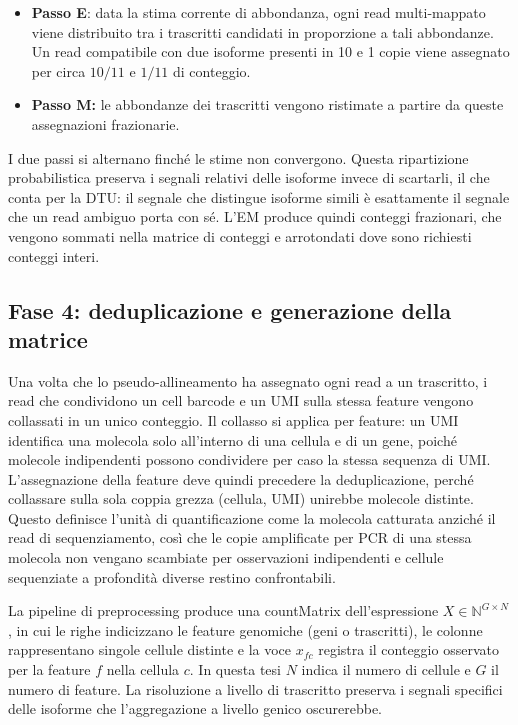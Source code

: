 \begin{itemize}
    \item \textbf{Passo E}: data la stima corrente di abbondanza, ogni read multi-mappato viene distribuito tra i trascritti candidati in proporzione a tali abbondanze. Un read compatibile con due isoforme presenti in 10 e 1 copie viene assegnato per circa $10/11$ e $1/11$ di conteggio.
    \item \textbf{Passo M:} le abbondanze dei trascritti vengono ristimate a partire da queste assegnazioni frazionarie.
\end{itemize}

I due passi si alternano finché le stime non convergono. Questa ripartizione probabilistica preserva i segnali relativi delle isoforme invece di scartarli\cite{he2022alevin}, il che conta per la DTU: il segnale che distingue isoforme simili è esattamente il segnale che un read ambiguo porta con sé. L'EM produce quindi conteggi frazionari, che vengono sommati nella matrice di conteggi e arrotondati dove sono richiesti conteggi interi.

\subsection{Fase 4: deduplicazione e generazione della matrice}
Una volta che lo pseudo-allineamento ha assegnato ogni read a un trascritto, i read che condividono un cell barcode e un UMI sulla stessa feature vengono collassati in un unico conteggio. Il collasso si applica per feature: un UMI identifica una molecola solo all'interno di una cellula e di un gene, poiché molecole indipendenti possono condividere per caso la stessa sequenza di UMI. L'assegnazione della feature deve quindi precedere la deduplicazione, perché collassare sulla sola coppia grezza (cellula, UMI) unirebbe molecole distinte. Questo definisce l'unità di quantificazione come la molecola catturata anziché il read di sequenziamento, così che le copie amplificate per PCR di una stessa molecola non vengano scambiate per osservazioni indipendenti e cellule sequenziate a profondità diverse restino confrontabili.

La pipeline di preprocessing produce una \gls{countMatrix} dell'espressione $X \in \mathbb{N}^{G \times N}$, in cui le righe indicizzano le feature genomiche (geni o trascritti), le colonne rappresentano singole cellule distinte e la voce $x_{fc}$ registra il conteggio osservato per la feature $f$ nella cellula $c$. In questa tesi $N$ indica il numero di cellule e $G$ il numero di feature. La risoluzione a livello di trascritto preserva i segnali specifici delle isoforme che l'aggregazione a livello genico oscurerebbe.


